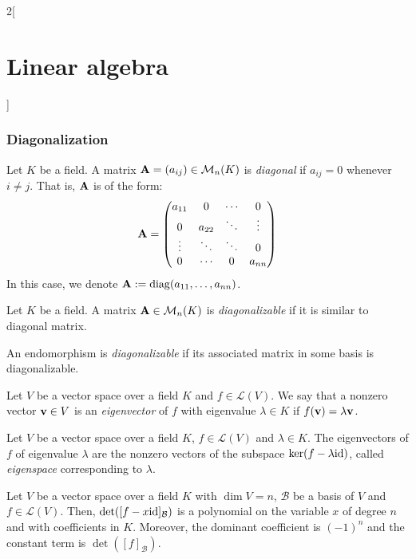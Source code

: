 \documentclass[../../../main.tex]{subfiles}
\begin{document}
\begin{multicols}{2}[\section{Linear algebra}]
  \subsubsection{Diagonalization}
  \begin{definition}
    Let $K$ be a field. A matrix $\boldsymbol{\mathrm{A}}=(a_{ij})\in\mathcal{M}_n(K)$ is \emph{diagonal} if $a_{ij}=0$ whenever $i\ne j$. That is, $\boldsymbol{\mathrm{A}}$ is of the form:
    $$\boldsymbol{\mathrm{A}}=
      \begin{pmatrix}
        a_{11} & 0      & \cdots & 0      \\
        0      & a_{22} & \ddots & \vdots \\
        \vdots & \ddots & \ddots & 0      \\
        0      & \cdots & 0      & a_{nn}
      \end{pmatrix}
    $$
    In this case, we denote $\boldsymbol{\mathrm{A}}:=\operatorname{diag}(a_{11},\ldots,a_{nn})$.
  \end{definition}
  \begin{definition}
    Let $K$ be a field. A matrix $\boldsymbol{\mathrm{A}}\in\mathcal{M}_n(K)$ is \emph{diagonalizable} if it is similar to diagonal matrix.
  \end{definition}
  \begin{definition}
    An endomorphism is \emph{diagonalizable} if its associated matrix in some basis is diagonalizable.
  \end{definition}
  \begin{definition}
    Let $V$ be a vector space over a field $K$ and $f\in\mathcal{L}(V)$. We say that a nonzero vector $\boldsymbol{\mathrm{v}}\in V$ is an \emph{eigenvector} of $f$ with eigenvalue $\lambda\in K$ if $f(\boldsymbol{\mathrm{v}})=\lambda \boldsymbol{\mathrm{v}}$.
  \end{definition}
  \begin{lemma}
    Let $V$ be a vector space over a field $K$, $f\in\mathcal{L}(V)$ and $\lambda\in K$. The eigenvectors of $f$ of eigenvalue $\lambda$ are the nonzero vectors of the subspace $\ker(f-\lambda\mathrm{id})$, called \emph{eigenspace} corresponding to $\lambda$.
  \end{lemma}
  \begin{lemma}
    Let $V$ be a vector space over a field $K$ with $\dim V=n$, $\mathcal{B}$ be a basis of $V$ and $f\in\mathcal{L}(V)$. Then, $\det([f-x\mathrm{id}]_\mathcal{B})$ is a polynomial on the variable $x$ of degree $n$ and with coefficients in $K$. Moreover, the dominant coefficient is $(-1)^n$ and the constant term is $\det([f]_\mathcal{B})$.

\end{lemma}
\end{multicols}
\end{document}
